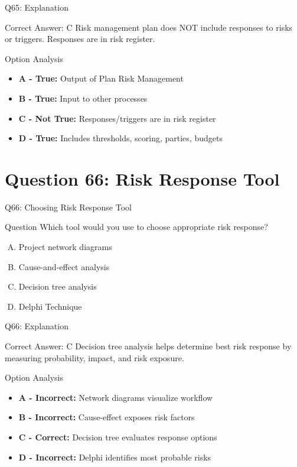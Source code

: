 \documentclass{beamer}
\begin{document}
	\begin{frame}{Q65: Explanation}
		\begin{block}{Correct Answer: C}
			Risk management plan does NOT include responses to risks or triggers. Responses are in risk register.
		\end{block}
		\begin{block}{Option Analysis}
			\begin{itemize}
				\item \textbf{A - True:} Output of Plan Risk Management
				\item \textbf{B - True:} Input to other processes
				\item \textbf{C - Not True:} Responses/triggers are in risk register
				\item \textbf{D - True:} Includes thresholds, scoring, parties, budgets
			\end{itemize}
		\end{block}
	\end{frame}
	
	\section{Question 66: Risk Response Tool}
	
	\begin{frame}{Q66: Choosing Risk Response Tool}
		\begin{block}{Question}
			Which tool would you use to choose appropriate risk response?
		\end{block}
		\begin{enumerate}[(A)]
			\item Project network diagrams
			\item Cause-and-effect analysis
			\item Decision tree analysis
			\item Delphi Technique
		\end{enumerate}
	\end{frame}
	
	\begin{frame}{Q66: Explanation}
		\begin{block}{Correct Answer: C}
			Decision tree analysis helps determine best risk response by measuring probability, impact, and risk exposure.
		\end{block}
		\begin{block}{Option Analysis}
			\begin{itemize}
				\item \textbf{A - Incorrect:} Network diagrams visualize workflow
				\item \textbf{B - Incorrect:} Cause-effect exposes risk factors
				\item \textbf{C - Correct:} Decision tree evaluates response options
				\item \textbf{D - Incorrect:} Delphi identifies most probable risks
			\end{itemize}
		\end{block}
	\end{frame}
	
\end{document}
